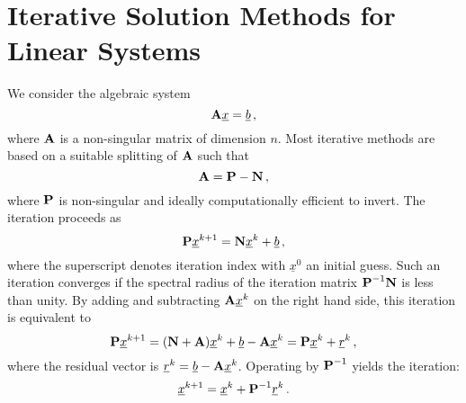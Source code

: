 \documentclass[../doc.tex]{subfiles}
\begin{document}
\section{Iterative Solution Methods for Linear Systems}
We consider the algebraic system 
	\begin{equation}
		\boldsymbol{\mathrm{A}} \underline{x} = \underline{b} \,, 
	\end{equation}
where $\boldsymbol{\mathrm{A}}$ is a non-singular matrix of dimension $n$. Most iterative methods are based on a suitable splitting of $\boldsymbol{\mathrm{A}}$ such that 
	\begin{equation}
		\boldsymbol{\mathrm{A}} = \boldsymbol{\mathrm{P}} - \boldsymbol{\mathrm{N}} \,, 
	\end{equation}
where $\boldsymbol{\mathrm{P}}$ is non-singular and ideally computationally efficient to invert. The iteration proceeds as 
	\begin{equation}
		\boldsymbol{\mathrm{P}} \underline{x}^{k+1} = \boldsymbol{\mathrm{N}}\underline{x}^k + \underline{b} \,,
	\end{equation}
where the superscript denotes iteration index with $\underline{x}^0$ an initial guess. 
Such an iteration converges if the spectral radius of the iteration matrix $\boldsymbol{\mathrm{P}}^{-1}\boldsymbol{\mathrm{N}}$ is less than unity. By adding and subtracting $\boldsymbol{\mathrm{A}}\underline{x}^k$ on the right hand side, this iteration is equivalent to 
	\begin{equation}
		\boldsymbol{\mathrm{P}}\underline{x}^{k+1} = (\boldsymbol{\mathrm{N}} + \boldsymbol{\mathrm{A}})\underline{x}^k + \underline{b} - \boldsymbol{\mathrm{A}}\underline{x}^k = \boldsymbol{\mathrm{P}}\underline{x}^k + \underline{r}^k \,, 
	\end{equation}
where the residual vector is $\underline{r}^k = \underline{b} - \boldsymbol{\mathrm{A}}\underline{x}^k$. Operating by $\boldsymbol{\mathrm{P}}^{-1}$ yields the iteration: 
	\begin{equation}
		\underline{x}^{k+1} = \underline{x}^k + \boldsymbol{\mathrm{P}}^{-1} \underline{r}^k \,. 
	\end{equation}
\end{document}

